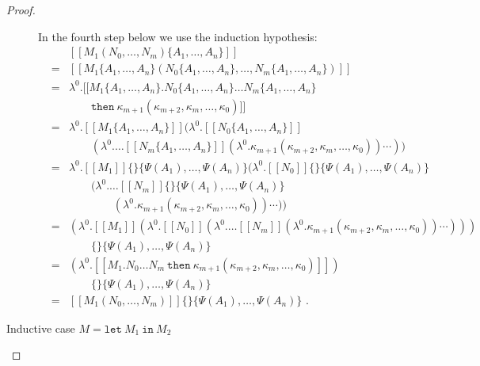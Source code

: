\documentclass[a4paper,11pt,draft]{article}
\newcommand{\kw}[1]{\mathtt{#1}}
\begin{document}
\begin{proof}
\begin{description}
  In the fourth step below we use the induction hypothesis:
  \begin{eqnarray*} %
    &   & [\![M_{1}(N_{0}, \ldots, N_{m})\{A_{1}, \ldots, A_{n}\}]\!] \\
    & = & [\![M_{1}\{A_{1}, \ldots, A_{n}\}(N_{0}\{A_{1}, \ldots, A_{n}\}, \ldots, N_{m}\{A_{1}, \ldots, A_{n}\})]\!] \\
    & = & \lambda^{0}.[\![M_{1}\{A_{1}, \ldots, A_{n}\}.N_{0}\{A_{1}, \ldots, A_{n}\} \ldots N_{m}\{A_{1}, \ldots, A_{n}\} \: \\
    &   & \qquad \kw{then} \: \kappa_{m+1}(\kappa_{m+2}, \kappa_{m}, \ldots, \kappa_{0})]\!] \\
    & = & \lambda^{0}.[\![M_{1}\{A_{1}, \ldots, A_{n}\}]\!](\lambda^{0}.[\![N_{0}\{A_{1}, \ldots, A_{n}\}]\!] \\
    &   & \qquad (\lambda^{0}. \ldots [\![N_{m}\{A_{1}, \ldots, A_{n}\}]\!](\lambda^{0}.\kappa_{m+1}(\kappa_{m+2}, \kappa_{m}, \ldots, \kappa_{0})) \cdots )) \\
    & = & \lambda^{0}.[\![M_{1}]\!]\{\}\{\Psi(A_{1}), \ldots, \Psi(A_{n})\}(\lambda^{0}.[\![N_{0}]\!]\{\}\{\Psi(A_{1}), \ldots, \Psi(A_{n})\} \\
    &   & \qquad (\lambda^{0}. \ldots [\![N_{m}]\!]\{\}\{\Psi(A_{1}), \ldots, \Psi(A_{n})\} \\
    &   & \qquad \qquad (\lambda^{0}.\kappa_{m+1}(\kappa_{m+2}, \kappa_{m}, \ldots, \kappa_{0})) \cdots )) \\ %
    & = & (\lambda^{0}.[\![M_{1}]\!](\lambda^{0}.[\![N_{0}]\!](\lambda^{0}. \ldots [\![N_{m}]\!](\lambda^{0}.\kappa_{m+1}(\kappa_{m+2}, \kappa_{m}, \ldots, \kappa_{0})) \cdots ))) \\
    &   & \qquad \{\}\{\Psi(A_{1}), \ldots, \Psi(A_{n})\} \\
    & = & (\lambda^{0}.[\![M_{1}.N_{0} \ldots N_{m} \: \kw{then} \: \kappa_{m+1}(\kappa_{m+2}, \kappa_{m}, \ldots, \kappa_{0})]\!]) \\
    &   & \qquad \{\}\{\Psi(A_{1}), \ldots, \Psi(A_{n})\} \\
    & = & [\![M_{1}(N_{0}, \ldots, N_{m})]\!]\{\}\{\Psi(A_{1}), \ldots, \Psi(A_{n})\} \text{ .}
  \end{eqnarray*}

\item[\sffamily Inductive case $M = \kw{let} \: M_{1} \: \kw{in} \: M_{2}$]\hfill


\end{description}
\end{proof}
\end{document}
